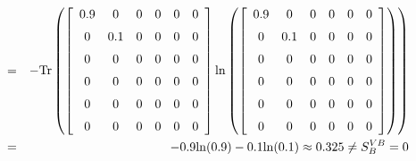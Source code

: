 \documentclass[10pt]{article}
\begin{document}
\begin{eqnarray*}
		&=& - {\rm Tr}\left(\left[ \begin {array}{cccccc}
			0.9&0&0&0&0&0\\
			\noalign{\medskip}
			0&0.1&0&0&0&0 \\ \noalign{\medskip}
			0&0&0&0&0&0 \\ \noalign{\medskip}
			0&0&0&0&0&0 \\ \noalign{\medskip}
			0&0&0&0&0&0 \\ \noalign{\medskip}
			0&0&0&0&0&0
			\end {array}
			\right] 
			{\rm ln}\left(\left[ \begin {array}{cccccc}
			0.9&0&0&0&0&0\\
			\noalign{\medskip}
			0&0.1&0&0&0&0 \\ \noalign{\medskip}
			0&0&0&0&0&0 \\ \noalign{\medskip}
			0&0&0&0&0&0 \\ \noalign{\medskip}
			0&0&0&0&0&0 \\ \noalign{\medskip}
			0&0&0&0&0&0
			\end {array}
			\right] \right)\right) \\
		&=& -0.9{\rm ln}(0.9) - 0.1{\rm ln}(0.1) \approx 0.325 \neq S^{VB}_B = 0
\end{eqnarray*}
\end{document}
